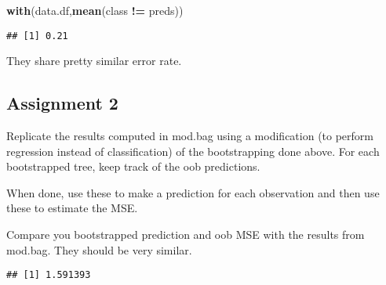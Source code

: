 \documentclass[]{article}
\newenvironment{Shaded}{\begin{snugshade}}{\end{snugshade}}
\newcommand{\DataTypeTok}[1]{\textcolor[rgb]{0.13,0.29,0.53}{#1}}
\newcommand{\DecValTok}[1]{\textcolor[rgb]{0.00,0.00,0.81}{#1}}
\newcommand{\KeywordTok}[1]{\textcolor[rgb]{0.13,0.29,0.53}{\textbf{#1}}}
\newcommand{\NormalTok}[1]{#1}
\newcommand{\OperatorTok}[1]{\textcolor[rgb]{0.81,0.36,0.00}{\textbf{#1}}}
\newcommand{\StringTok}[1]{\textcolor[rgb]{0.31,0.60,0.02}{#1}}
\begin{document}
\begin{Shaded}
\begin{Highlighting}[]
\KeywordTok{with}\NormalTok{(data.df,}\KeywordTok{mean}\NormalTok{(class }\OperatorTok{!=}\StringTok{ }\NormalTok{preds))}
\end{Highlighting}
\end{Shaded}

\begin{verbatim}
## [1] 0.21
\end{verbatim}

They share pretty similar error rate.

\hypertarget{assignment-2-1}{%
\subsection{Assignment 2}\label{assignment-2-1}}

Replicate the results computed in mod.bag using a modification (to
perform regression instead of classification) of the bootstrapping done
above. For each bootstrapped tree, keep track of the oob predictions.

When done, use these to make a prediction for each observation and then
use these to estimate the MSE.

Compare you bootstrapped prediction and oob MSE with the results from
mod.bag. They should be very similar.

\begin{Shaded}
\end{Shaded}

\begin{verbatim}
## [1] 1.591393
\end{verbatim}
\end{document}
